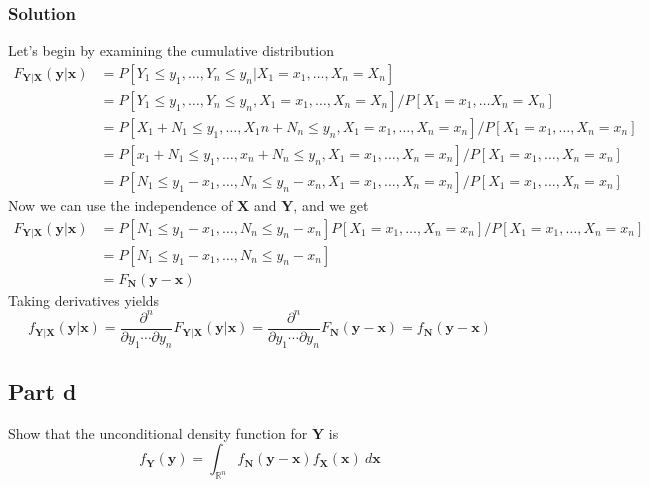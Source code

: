 \documentclass[a4paper]{article}
\begin{document}
\subsubsection*{Solution}%
Let's begin by examining the cumulative distribution
\[
  \begin{aligned}
    F_{\mathbf{Y}|\mathbf{X}}(\mathbf{y}|\mathbf{x}) &= P[Y_1 \leq y_1, \dots, Y_n \leq y_n | X_1 = x_1, \dots, X_n = X_n] \\
                                                     &= P[Y_1 \leq y_1, \dots, Y_n \leq y_n , X_1 = x_1, \dots, X_n = X_n]/ P[X_1 = x_1, \dots X_n = X_n] \\
                                                     &= P[X_1 + N_1 \leq y_1, \dots, X_1n+ N_n \leq y_n, X_1 = x_1, \dots, X_n = x_n]/P[X_1 = x_1, \dots, X_n = x_n] \\
                                                     &= P[x_1 + N_1 \leq y_1, \dots, x_n + N_n \leq y_n, X_1 = x_1, \dots, X_n = x_n]/P[X_1 = x_1, \dots, X_n = x_n] \\
                                                     &= P[N_1 \leq y_1 - x_1, \dots, N_n \leq y_n - x_n, X_1 = x_1, \dots, X_n = x_n]/P[X_1 = x_1, \dots, X_n = x_n]
  \end{aligned}
\]
Now we can use the independence of $\mathbf{X}$ and $\mathbf{Y}$, and we get
\[
  \begin{aligned}
    F_{\mathbf{Y}|\mathbf{X}}(\mathbf{y}|\mathbf{x}) &= P[N_1 \leq y_1 - x_1, \dots, N_n \leq y_n - x_n]P[X_1 = x_1, \dots, X_n = x_n]/P[X_1 = x_1, \dots, X_n = x_n]\\
                                                     &=P[N_1 \leq y_1 - x_1, \dots, N_n \leq y_n - x_n] \\
                                                     &= F_{\mathbf{N}}(\mathbf{y} - \mathbf{x})
  \end{aligned}
\]
Taking derivatives yields
\[
  f_{\mathbf{Y}|\mathbf{X}}(\mathbf{y}|\mathbf{x}) = \frac{\partial^n}{\partial y_1 \cdots \partial y_n}F_{\mathbf{Y}|\mathbf{X}}(\mathbf{y}|\mathbf{x}) = \frac{\partial^n}{\partial y_1 \cdots \partial y_n} F_{\mathbf{N}}(\mathbf{y} - \mathbf{x}) = f_{\mathbf{N}}(\mathbf{y} - \mathbf{x})
\]

\subsection*{Part d}%
Show that the unconditional density function for $\mathbf{Y}$ is
\[
  f_{\mathbf{Y}}(\mathbf{y}) =  \int_{\mathds{R}^n} f_{\mathbf{N}}(\mathbf{y} - \mathbf{x})f_{\mathbf{X}}(\mathbf{x})\ d\mathbf{x}
\]
\end{document}
